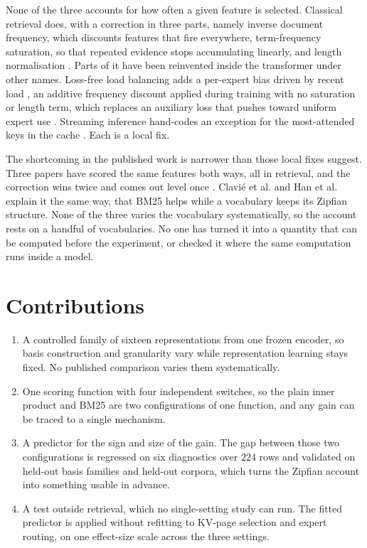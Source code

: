 \documentclass[11pt]{article}
\begin{document}
None of the three accounts for how often a given feature is selected.
Classical retrieval does, with a correction in three
parts, namely inverse document frequency, which discounts features that fire
everywhere, term-frequency saturation, so that repeated evidence stops accumulating
linearly, and length normalisation \citep{robertson2009bm25}. Parts of it have been
reinvented inside the transformer under other names. Loss-free load balancing adds
a per-expert bias driven by recent load \citep{wang2024lossfree}, an additive
frequency discount applied during training with no saturation or length term, which
replaces an auxiliary loss that pushes toward uniform expert use \citep{zoph2022stmoe}.
Streaming inference hand-codes an exception for the
most-attended keys in the cache \citep{xiao2024streamingllm}. Each is a local fix.

The shortcoming in the published work is narrower than those local fixes suggest.
Three papers have scored the same features both ways, all in retrieval, and the
correction wins twice \citep{clavie2026latent,park2025clsr} and comes out level once
\citep{han2026bm25v}. Clavi\'e et al. and Han et al. explain it the same way, that
BM25 helps while a vocabulary keeps its Zipfian structure. None of the three varies
the vocabulary systematically, so the account rests on a handful of vocabularies. No
one has turned it into a quantity that can be computed before the experiment, or
checked it where the same computation runs inside a model.

\section{Contributions}
\label{sec:contributions}

\begin{enumerate}
\item A controlled family of sixteen representations from one frozen encoder, so
basis construction and granularity vary while representation learning stays fixed.
No published comparison varies them systematically.
\item One scoring function with four independent switches, so the plain inner
product and BM25 are two configurations of one function, and any gain can be traced
to a single mechanism.
\item A predictor for the sign and size of the gain. The gap between those two
configurations is regressed on six diagnostics over $224$ rows and validated on
held-out basis families and held-out corpora, which turns the Zipfian account into
something usable in advance.
\item A test outside retrieval, which no single-setting study can run. The fitted
predictor is applied without refitting to KV-page selection and expert routing, on
one effect-size scale across the three settings.
\end{enumerate}
\end{document}
